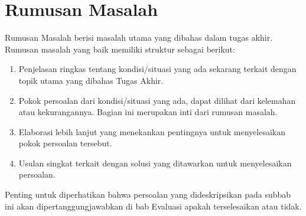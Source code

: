 \section{Rumusan Masalah}

Rumusan Masalah berisi masalah utama yang dibahas dalam tugas akhir. Rumusan masalah yang baik memiliki struktur sebagai berikut:

\begin{enumerate}
    \item Penjelasan ringkas tentang kondisi/situasi yang ada sekarang terkait dengan topik utama yang dibahas Tugas Akhir.
    \item Pokok persoalan dari kondisi/situasi yang ada, dapat dilihat dari kelemahan atau kekurangannya. Bagian ini merupakan inti dari rumusan masalah.
    \item Elaborasi lebih lanjut yang menekankan pentingnya untuk menyelesaikan pokok persoalan tersebut.
    \item Usulan singkat terkait dengan solusi yang ditawarkan untuk menyelesaikan persoalan.
\end{enumerate}

Penting untuk diperhatikan bahwa persoalan yang dideskripsikan pada subbab ini akan dipertanggungjawabkan di bab Evaluasi apakah terselesaikan atau tidak.
